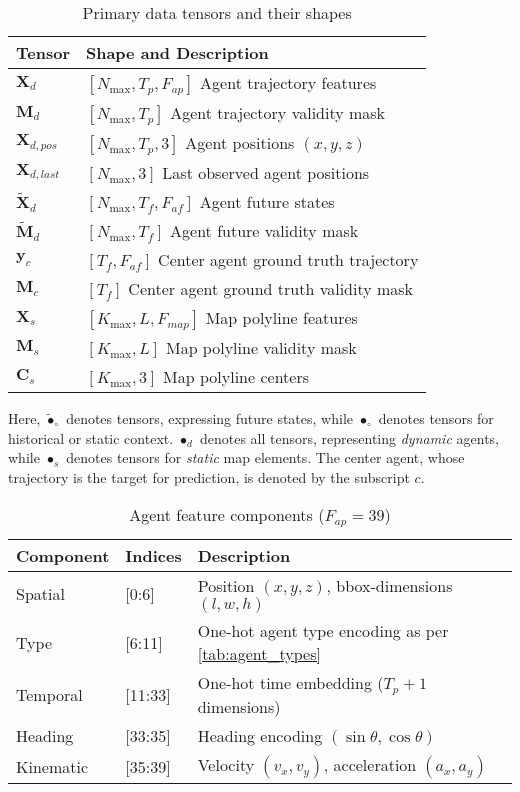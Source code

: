 \begin{table}[H]
\caption{Primary data tensors and their shapes}
\label{tab:data_tensors}
\centering
\begin{tabular}{p{4cm}p{9cm}}
\toprule
\textbf{Tensor} & \textbf{Shape and Description} \\
\midrule
\(\boldsymbol{X}_d\) & \([N_{\max}, T_p, F_{ap}]\) Agent trajectory features \\
\(\boldsymbol{M}_d\) & \([N_{\max}, T_p]\) Agent trajectory validity mask \\
\(\boldsymbol{X}_{d,pos}\) & \([N_{\max}, T_p, 3]\) Agent positions \((x, y, z)\) \\
\(\boldsymbol{X}_{d,last}\) & \([N_{\max}, 3]\) Last observed agent positions \\
\(\tilde{\boldsymbol{X}}_d\) & \([N_{\max}, T_f, F_{af}]\) Agent future states \\
\(\tilde{\boldsymbol{M}}_d\) & \([N_{\max}, T_f]\) Agent future validity mask \\
\(\boldsymbol{y}_c\) & \([T_f, F_{af}]\) Center agent ground truth trajectory \\
\(\boldsymbol{M}_c\) & \([T_f]\) Center agent ground truth validity mask \\
\(\boldsymbol{X}_s\) & \([K_{\max}, L, F_{map}]\) Map polyline features \\
\(\boldsymbol{M}_s\) & \([K_{\max}, L]\) Map polyline validity mask \\
\(\boldsymbol{C}_s\) & \([K_{\max}, 3]\) Map polyline centers \\
\bottomrule
\end{tabular}
\end{table}

Here, \( \tilde{\bullet}_{\circ} \) denotes tensors, expressing future states, while \(\bullet_{\circ}\) denotes tensors for historical or static context. \( \bullet_{d} \) denotes all tensors, representing \emph{dynamic} agents, while \(\bullet_{s}\) denotes tensors for \emph{static} map elements. The center agent, whose trajectory is the target for prediction, is denoted by the subscript \(c\).

\begin{table}[H]
\caption{Agent feature components ($F_{ap} = 39$)}
\centering
\begin{tabular}{p{3cm}p{3cm}p{7cm}}
\toprule
\textbf{Component} & \textbf{Indices} & \textbf{Description} \\
\midrule
Spatial & [0:6] & Position \((x, y, z)\), bbox-dimensions \((l, w, h)\) \\
Type & [6:11] & One-hot agent type encoding as per \ref{tab:agent_types}\\
Temporal & [11:33] & One-hot time embedding (\(T_p + 1\) dimensions) \\
Heading & [33:35] & Heading encoding \((\sin\theta, \cos\theta)\) \\
Kinematic & [35:39] & Velocity \((v_x, v_y)\), acceleration \((a_x, a_y)\) \\
\bottomrule
\end{tabular}
\end{table}

